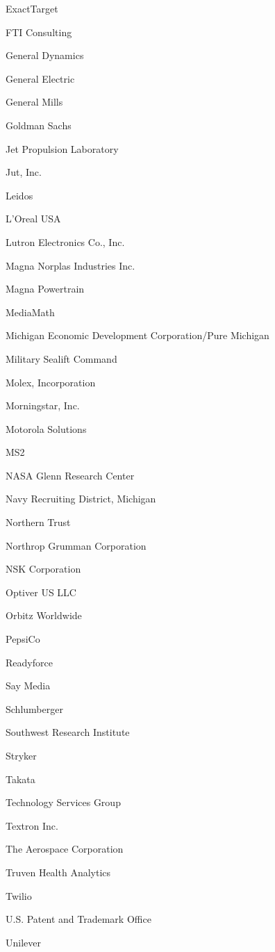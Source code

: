 \documentclass[twoside]{article}
\begin{document}
\begin{center}
\begin{multicols}{5}
\begin{FlushLeft}
\begin{compactitem}
\item ExactTarget
\item FTI Consulting
\item General Dynamics
\item General Electric
\item General Mills
\item Goldman Sachs
\item Jet Propulsion Laboratory
\item Jut, Inc.
\item Leidos
\item L'Oreal USA
\item Lutron Electronics Co., Inc.
\item Magna Norplas Industries Inc.
\item Magna Powertrain
\item MediaMath
\item Michigan Economic Development Corporation/Pure Michigan
\item Military Sealift Command
\item Molex, Incorporation
\item Morningstar, Inc.
\item Motorola Solutions
\item MS2
\item NASA Glenn Research Center
\item Navy Recruiting District, Michigan
\item Northern Trust
\item Northrop Grumman Corporation
\item NSK Corporation
\item Optiver US LLC
\item Orbitz Worldwide
\item PepsiCo
\item Readyforce
\item Say Media
\item Schlumberger
\item Southwest Research Institute
\item Stryker
\item Takata
\item Technology Services Group
\item Textron Inc.
\item The Aerospace Corporation
\item Truven Health Analytics
\item Twilio
\item U.S. Patent and Trademark Office
\item Unilever

\end{compactitem}
\end{FlushLeft}
\end{multicols}
\end{center}
\end{document}
